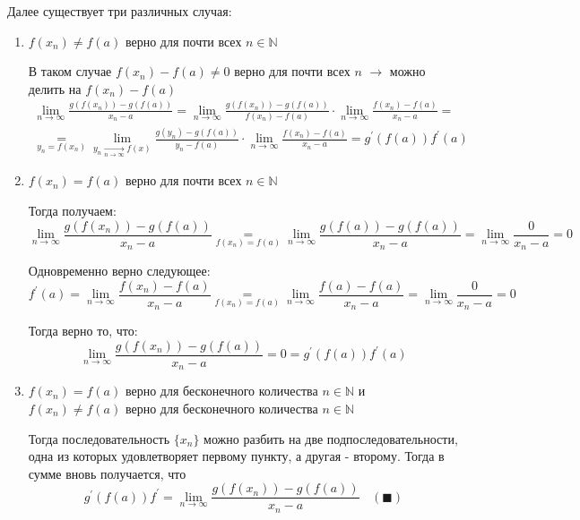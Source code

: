 \documentclass[class=article,a4paper,12pt,crop=false]{standalone}
\begin{document}
Далее существует три различных случая:
\begin{enumerate}
    \item {
        $f(x_n) \neq f(a)$ верно для почти всех $n \in \mathbb{N}$

        В таком случае $f(x_n) - f(a) \neq 0$ верно для почти всех $n$ $\rightarrow$ можно делить
        на $f(x_n) - f(a)$
        \begin{multline}
            \lim\limits_{n \rightarrow \infty}\frac{g(f(x_n)) - g(f(a))}{x_n - a} = 
            \lim\limits_{n \rightarrow \infty}\frac{g(f(x_n)) - g(f(a))}{f(x_n) - f(a)} \cdot \lim\limits_{n \rightarrow \infty}\frac{f(x_n) - f(a)}{x_n - a} = \\
            \underset{y_n = f(x_n)}{=} \lim\limits_{y_n \underset{n \rightarrow \infty}{\rightarrow} f(x)}\frac{
                g(y_n) - g(f(a))
            }{y_n - f(a)}\cdot{\lim\limits_{n \rightarrow \infty}\frac{f(x_n) - f(a)}{x_n - a}} =
            g^{'}(f(a))f^{'}(a)
        \end{multline}
    }
    \item {
        $f(x_n) = f(a)$ верно для почти всех $n \in \mathbb{N}$
        
        Тогда получаем:
        \begin{equation}
            \lim\limits_{n \rightarrow \infty}\frac{g(f(x_n)) - g(f(a))}{x_n - a} 
            \underset{f(x_n) = f(a)}{=} \lim\limits_{n \rightarrow \infty}\frac{g(f(a)) - g(f(a))}{x_n - a} =
            \lim\limits_{n \rightarrow \infty}\frac{0}{x_n - a} = 0  
        \end{equation}

        Одновременно верно следующее:
        \begin{equation}
            f^{'}(a) = \lim\limits_{n \rightarrow \infty}\frac{f(x_n) - f(a)}{x_n - a}
            \underset{f(x_n) = f(a)}{=} \lim\limits_{n\rightarrow\infty}\frac{
                f(a) - f(a)
            }{x_n - a} = \lim\limits_{n \rightarrow \infty}\frac{0}{x_n - a} = 0
        \end{equation}

        Тогда верно то, что:
        \begin{equation}
            \lim\limits_{n \rightarrow \infty}\frac{g(f(x_n)) - g(f(a))}{x_n - a} = 0 =
            g^{'}(f(a))f^{'}(a)
        \end{equation}
    }
    \item {
        $f(x_n) = f(a)$ верно для бесконечного количества $n \in \mathbb{N}$ и
        $f(x_n) \neq f(a)$ верно для бесконечного количества $n \in \mathbb{N}$

        Тогда последовательность $\{x_n\}$ можно разбить на две подпоследовательности,
        одна из которых удовлетворяет первому пункту, а другая - второму. Тогда в сумме
        вновь получается, что
        \begin{equation}
            g^{'}(f(a))f^{'} = \lim\limits_{n \rightarrow \infty}\frac{g(f(x_n)) - g(f(a))}{x_n - a} \:\:\:\: (\blacksquare)
        \end{equation}
    }
\end{enumerate}
\end{document}
